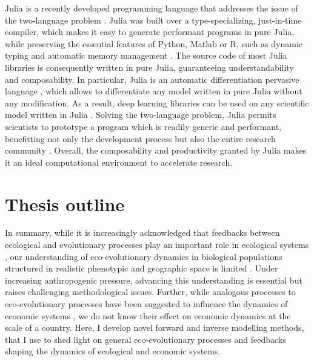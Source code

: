 Julia is a recently developed programming language that addresses the issue of the two-language problem \citep{Bezanson2017,Bezanson2018}. Julia was built over a type-specializing, just-in-time compiler, which makes it easy to generate performant programs in pure Julia, while preserving the essential features of Python, Matlab or R, such as dynamic typing and automatic memory management \citep{Perkel2019}. 
% 
The source code of most Julia libraries is consequently written in pure Julia, guaranteeing understandability and composability.
% 
In particular, Julia is an automatic differentiation pervasive language \citep{Innes2019}, which allows to differentiate any model written in pure Julia without any modification. As a result, deep learning libraries can be used on any scientific model written in Julia \citep{Rackauckas2020a}.
% 
Solving the two-language problem, Julia permits scientists to prototype a program which is readily generic and performant, benefitting not only the development process but also the entire research community \citep{Bezanson2017}.
% 
% 
Overall, the composability and productivity granted by Julia makes it an ideal computational environment to accelerate research. 

\section{Thesis outline}

In summary, while it is increasingly acknowledged that feedbacks between ecological and evolutionary processes play an important role in ecological systems \citep{Pelletier2009, Urban2016}, our understanding of eco-evolutionary dynamics in biological populations structured in realistic phenotypic and geographic space is limited \citep{Lion2016,LiebermanHauert2005,Doebeli2011}.
% 
Under increasing anthropogenic pressure, advancing this understanding is essential \citep{Urban2016} but raises challenging methodological issues.
% 
Further, while analogous processes to eco-evolutionary processes have been suggested to influence the dynamics of economic systems \citep{Hodgson2019}, we do not know their effect on economic dynamics at the scale of a country.
% 
Here, I develop novel forward and inverse modelling methods, that I use to shed light on general eco-evolutionary processes and feedbacks shaping the dynamics of ecological and economic systems.


